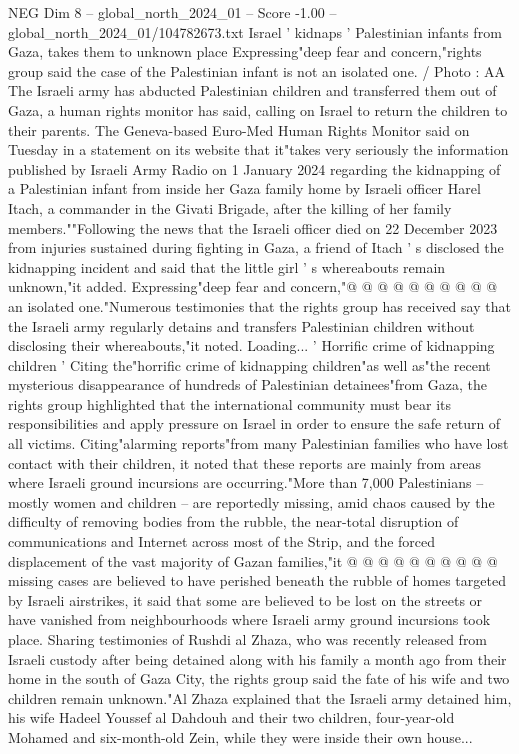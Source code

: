 \begin{textsample}{NEG Dim 8 – global\_north\_2024\_01 – Score -1.00 – global\_north\_2024\_01/104782673.txt}  \label{ex:f8_neg_272}
Israel ' kidnaps ' Palestinian infants from Gaza, takes them to unknown place Expressing"deep fear and concern,"rights group said the case of the Palestinian infant is not an isolated one. / Photo : AA The Israeli army has abducted Palestinian children and transferred them out of Gaza, a human rights monitor has said, calling on Israel to return the children to their parents.
The Geneva-based Euro-Med Human Rights Monitor said on Tuesday in a statement on its website that it"takes very seriously the information published by Israeli Army Radio on 1 January 2024 regarding the kidnapping of a Palestinian infant from inside her Gaza family home by Israeli officer Harel Itach, a commander in the Givati Brigade, after the killing of her family members.""Following the news that the Israeli officer died on 22 December 2023 from injuries sustained during fighting in Gaza, a friend of Itach ' s disclosed the kidnapping incident and said that the little girl ' s whereabouts remain unknown,"it added.
Expressing"deep fear and concern,"@ @ @ @ @ @ @ @ @ @ an isolated one."Numerous testimonies that the rights group has received say that the Israeli army regularly detains and transfers Palestinian children without disclosing their whereabouts,"it noted.
Loading... ' Horrific crime of kidnapping children ' Citing the"horrific crime of kidnapping children"as well as"the recent mysterious disappearance of hundreds of Palestinian detainees"from Gaza, the rights group highlighted that the international community must bear its responsibilities and apply pressure on Israel in order to ensure the safe return of all victims.
Citing"alarming reports"from many Palestinian families who have lost contact with their children, it noted that these reports are mainly from areas where Israeli ground incursions are occurring."More than 7,000 Palestinians -- mostly women and children -- are reportedly missing, amid chaos caused by the difficulty of removing bodies from the rubble, the near-total disruption of communications and Internet across most of the Strip, and the forced displacement of the vast majority of Gazan families,"it @ @ @ @ @ @ @ @ @ @ missing cases are believed to have perished beneath the rubble of homes targeted by Israeli airstrikes, it said that some are believed to be lost on the streets or have vanished from neighbourhoods where Israeli army ground incursions took place.
Sharing testimonies of Rushdi al Zhaza, who was recently released from Israeli custody after being detained along with his family a month ago from their home in the south of Gaza City, the rights group said the fate of his wife and two children remain unknown."Al Zhaza explained that the Israeli army detained him, his wife Hadeel Youssef al Dahdouh and their two children, four-year-old Mohamed and six-month-old Zein, while they were inside their own house...

\end{textsample}
